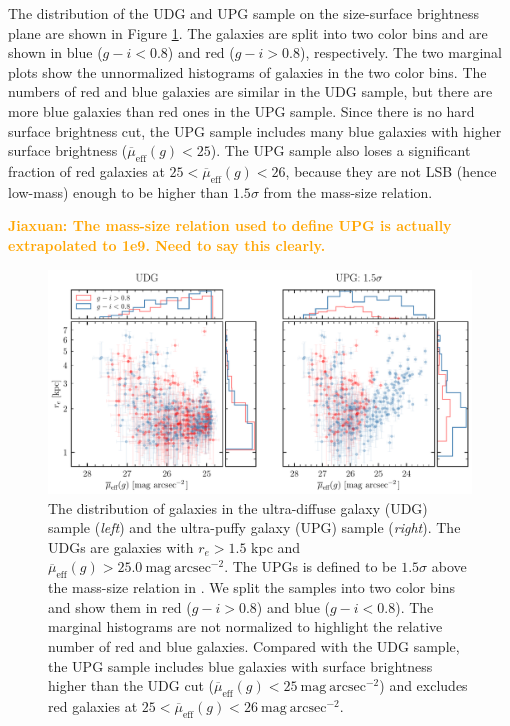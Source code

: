 \documentclass[twocolumn,astrosymb,twocolappendix]{aastex631}
\newcommand{\sbunit}{\mathrm{mag\ arcsec}^{-2}}
\newcommand{\sbeff}{\overline{\mu}_{\mathrm{eff}}(g)}
\newcommand{\jiaxuan}[1]{\textcolor{orange}{\textbf{Jiaxuan: #1}}}
\begin{document}
\begin{CJK*}{UTF8}{gbsn}
The distribution of the UDG and UPG sample on the size-surface brightness plane are shown in Figure \ref{fig:udg_upg_re_mu}. The galaxies are split into two color bins and are shown in blue ($g-i < 0.8$) and red ($g-i > 0.8$), respectively. The two marginal plots show the unnormalized histograms of galaxies in the two color bins. The numbers of red and blue galaxies are similar in the UDG sample, but there are more blue galaxies than red ones in the UPG sample. Since there is no hard surface brightness cut, the UPG sample includes many blue galaxies with higher surface brightness ($\sbeff < 25$). The UPG sample also loses a significant fraction of red galaxies at $25 < \sbeff < 26$, because they are not LSB (hence low-mass) enough to be higher than $1.5\sigma$ from the mass-size relation.

\jiaxuan{The mass-size relation used to define UPG is actually extrapolated to 1e9. Need to say this clearly.}

\begin{figure}
	\vbox{ 
		\centering
		\includegraphics[width=1\linewidth]{udg_upg_sample.pdf}
	}
    \caption{The distribution of galaxies in the ultra-diffuse galaxy (UDG) sample (\textit{left}) and the ultra-puffy galaxy (UPG) sample (\textit{right}). The UDGs are galaxies with $r_e>1.5$ kpc and $\sbeff > 25.0\ \sbunit$. The UPGs is defined to be $1.5\sigma$ above the mass-size relation in \citet{ELVES-I}. We split the samples into two color bins and show them in red ($g-i>0.8$) and blue ($g-i<0.8$). The marginal histograms are not normalized to highlight the relative number of red and blue galaxies. Compared with the UDG sample, the UPG sample includes blue galaxies with surface brightness higher than the UDG cut ($\sbeff < 25\ \sbunit$) and excludes red galaxies at $25 < \sbeff < 26\ \sbunit$.
    }
    \label{fig:udg_upg_re_mu}
\end{figure}


\end{CJK*}
\end{document}
